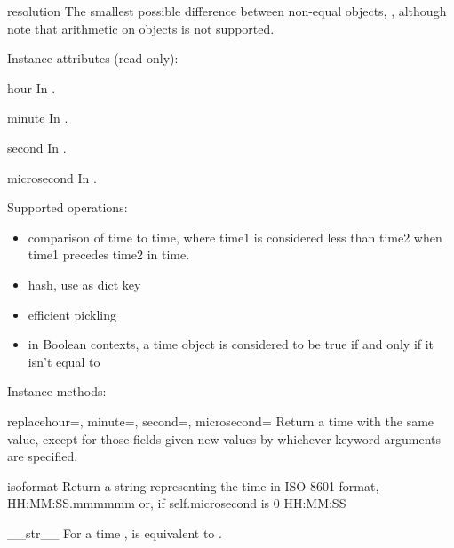 \begin{memberdesc}{resolution}
        The smallest possible difference between non-equal 
        objects, , although note that
        arithmetic on  objects is not supported.
\end{memberdesc}

Instance attributes (read-only):

\begin{memberdesc}{hour}
In .
\end{memberdesc}
\begin{memberdesc}{minute}
In .
\end{memberdesc}
\begin{memberdesc}{second}
In .
\end{memberdesc}
\begin{memberdesc}{microsecond}
In .
\end{memberdesc}

Supported operations:

\begin{itemize}
  \item
    comparison of time to time, where time1 is considered
    less than time2 when time1 precedes time2 in time.

  \item
    hash, use as dict key

  \item
    efficient pickling

  \item
    in Boolean contexts, a time object is considered to be true
    if and only if it isn't equal to 
\end{itemize}

Instance methods:

\begin{methoddesc}{replace}{hour=, minute=, second=, microsecond=}
    Return a time with the same value, except for those fields given
    new values by whichever keyword arguments are specified.
\end{methoddesc}

\begin{methoddesc}{isoformat}{}
    Return a string representing the time in ISO 8601 format,
        HH:MM:SS.mmmmmm
    or, if self.microsecond is 0
        HH:MM:SS
\end{methoddesc}

\begin{methoddesc}{__str__}{}
    For a time ,  is equivalent to
    .
\end{methoddesc}

